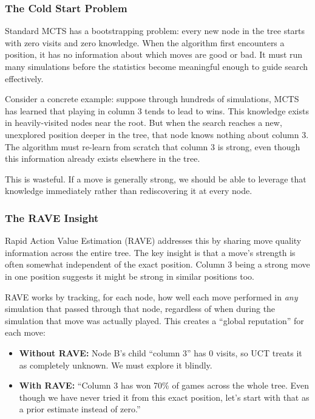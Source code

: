 \documentclass[11pt]{article}
\begin{document}
\subsubsection{The Cold Start Problem}

Standard MCTS has a bootstrapping problem: every new node in the tree starts with zero visits and zero knowledge. When the algorithm first encounters a position, it has no information about which moves are good or bad. It must run many simulations before the statistics become meaningful enough to guide search effectively.

Consider a concrete example: suppose through hundreds of simulations, MCTS has learned that playing in column 3 tends to lead to wins. This knowledge exists in heavily-visited nodes near the root. But when the search reaches a new, unexplored position deeper in the tree, that node knows nothing about column 3. The algorithm must re-learn from scratch that column 3 is strong, even though this information already exists elsewhere in the tree.

This is wasteful. If a move is generally strong, we should be able to leverage that knowledge immediately rather than rediscovering it at every node.

\subsubsection{The RAVE Insight}

Rapid Action Value Estimation (RAVE) addresses this by sharing move quality information across the entire tree. The key insight is that a move's strength is often somewhat independent of the exact position. Column 3 being a strong move in one position suggests it might be strong in similar positions too.

RAVE works by tracking, for each node, how well each move performed in \textit{any} simulation that passed through that node, regardless of when during the simulation that move was actually played. This creates a ``global reputation'' for each move:

\begin{itemize}
    \item \textbf{Without RAVE:} Node B's child ``column 3'' has 0 visits, so UCT treats it as completely unknown. We must explore it blindly.
    \item \textbf{With RAVE:} ``Column 3 has won 70\% of games across the whole tree. Even though we have never tried it from this exact position, let's start with that as a prior estimate instead of zero.''
\end{itemize}
\end{document}
